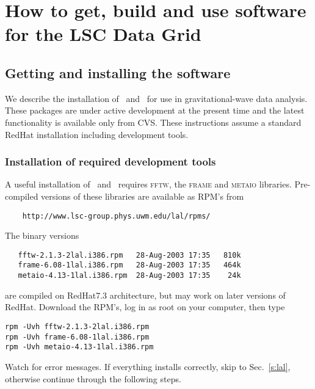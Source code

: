 %
%
\color{black}
\chapter{How to get, build and use software for the LSC Data Grid} 
\section{Getting and installing the software}

We describe the installation of \lal\ and \lalapps\ for use in
gravitational-wave data analysis.   These packages are under active
development at the present time and the latest functionality is
available only from CVS.   These instructions assume a standard
RedHat installation including development tools.   

\subsection{Installation of required development tools}

A useful installation of \lal\ and \lalapps\ requires \textsc{fftw},
the \textsc{frame} and \textsc{metaio} libraries.   Pre-compiled
versions of these libraries are available as RPM's from
\begin{verbatim}
    http://www.lsc-group.phys.uwm.edu/lal/rpms/
\end{verbatim}
The binary versions
\begin{verbatim}
   fftw-2.1.3-2lal.i386.rpm   28-Aug-2003 17:35   810k  
   frame-6.08-1lal.i386.rpm   28-Aug-2003 17:35   464k  
   metaio-4.13-1lal.i386.rpm  28-Aug-2003 17:35    24k  
\end{verbatim}
are compiled on RedHat7.3 architecture,  but may work on later
versions of RedHat.   Download the RPM's,  log in as root on your
computer,  then type
\begin{verbatim}
rpm -Uvh fftw-2.1.3-2lal.i386.rpm
rpm -Uvh frame-6.08-1lal.i386.rpm
rpm -Uvh metaio-4.13-1lal.i386.rpm
\end{verbatim}
Watch for error messages.   If everything installs correctly,  skip to
Sec.~\ref{s:lal},  otherwise continue through the following steps.  

